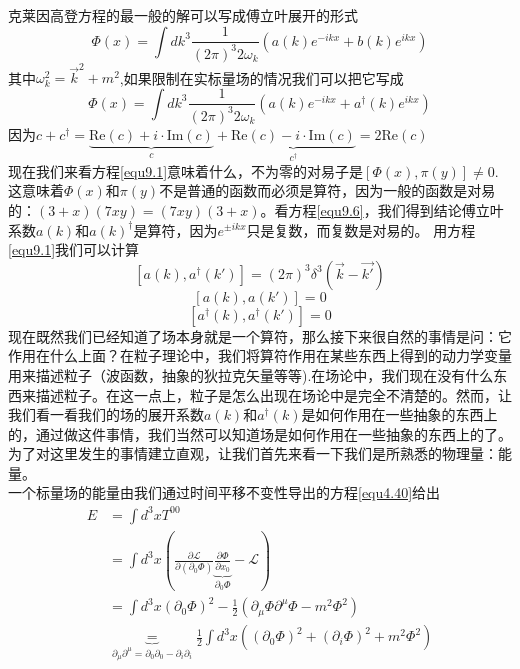 克莱因高登方程的最一般的解可以写成傅立叶展开的形式
\begin{equation} \label{equ9.5}
\Phi(x)=\int dk^{3}\frac{1}{(2\pi)^{3}2\omega_{k}}(a(k)e^{-ikx}+b(k)e^{ikx})
\end{equation}
其中$\omega_k^{2}=\vec{k}^{2}+m^{2}$,如果限制在实标量场的情况我们可以把它写成
\begin{equation} \label{equ9.6}
\Phi(x)=\int dk^{3}\frac{1}{(2\pi)^{3}2\omega_{k}}(a(k)e^{-ikx}+a^{\dag}(k)e^{ikx})
\end{equation}
因为$c+c^{\dag}=\underbrace{\text{Re}(c)+i \cdot \text{Im}(c)}_{c}+\underbrace{\text{Re}(c)-i \cdot \text{Im}(c)}_{c^{\dag}}=2\text{Re}(c)$\\
现在我们来看方程\ref{equ9.1}意味着什么，不为零的对易子是$[\Phi(x),\pi(y)]\neq 0$. 这意味着$\Phi(x)$和$\pi(y)$不是普通的函数而必须是算符，因为一般的函数是对易的：$(3+x)(7xy)=(7xy)(3+x)$。看方程\ref{equ9.6}，我们得到结论傅立叶系数$a(k)$和$a(k)^{\dag}$是算符，因为$e^{\pm ikx}$只是复数，而复数是对易的。
用方程\ref{equ9.1}我们可以计算
\begin{equation} \label{equ9.7}
[a(k),a^{\dag}(k')]=(2\pi)^{3}\delta^{3}(\vec{k}-\vec{k'})
\end{equation}
\begin{equation} \label{equ9.8}
[a(k),a(k')]=0
\end{equation}
\begin{equation} \label{equ9.9}
[a^{\dag}(k),a^{\dag}(k')]=0
\end{equation}
现在既然我们已经知道了场本身就是一个算符，那么接下来很自然的事情是问：它作用在什么上面？在粒子理论中，我们将算符作用在某些东西上得到的动力学变量用来描述粒子（波函数，抽象的狄拉克矢量等等).在场论中，我们现在没有什么东西来描述粒子。在这一点上，粒子是怎么出现在场论中是完全不清楚的。然而，让我们看一看我们的场的展开系数$a(k)$和$a^{\dag}(k)$是如何作用在一些抽象的东西上的，通过做这件事情，我们当然可以知道场是如何作用在一些抽象的东西上的了。为了对这里发生的事情建立直观，让我们首先来看一下我们是所熟悉的物理量：能量。\\
一个标量场的能量由我们通过时间平移不变性导出的方程\ref{equ4.40}给出
\begin{align} \label{equ9.10}
E&=\int d^{3}x T^{00}\\&=\int d^{3}x(\frac{\partial \mathscr{L}}{\partial(\partial_{0}\Phi)}\underbrace{\frac{\partial \Phi}{\partial x_{0}}}_{\partial_{0}\Phi}-\mathscr{L})\\&=\int d^{3}x(\partial_{0}\Phi)^{2}-\frac{1}{2}(\partial_{\mu}\Phi \partial^{\mu}\Phi-m^{2}\Phi^{2})\\ &\underbrace{=}_{\partial_{\mu}\partial^{\mu}=\partial_{0} \partial_{0}-\partial_{i}\partial_{i}}\frac{1}{2}\int d^{3}x( (\partial_{0}\Phi)^{2}+(\partial_{i}\Phi)^{2}+m^{2}\Phi^{2})
\end{align}
